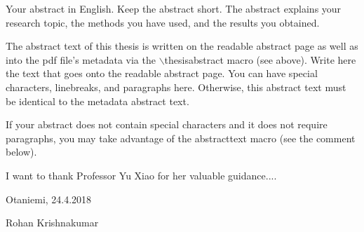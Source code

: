 \documentclass[english, 12pt, a4paper, elec, utf8, a-1b, online]{aaltothesis}
\date{24.4.2018}
\begin{document}
\makecoverpage

\makecopyrightpage


\begin{abstractpage}[english]
  Your abstract in English. Keep the abstract short. The abstract explains your
  research topic, the methods you have used, and the results you obtained.  
  
  The abstract text of this thesis is written on the readable abstract page as
  well as into the pdf file's metadata via the $\backslash$thesisabstract macro
  (see above). Write here the text that goes onto the readable abstract page.
  You can have special characters, linebreaks, and paragraphs here. Otherwise,
  this abstract text must be identical to the metadata abstract text.
  
  If your abstract does not contain special characters and it does not require
  paragraphs, you may take advantage of the abstracttext macro (see the comment
  below).
\end{abstractpage}


I want to thank Professor Yu Xiao for her valuable guidance....

\vspace{5cm}
Otaniemi, 24.4.2018

\vspace{5mm}
{\hfill Rohan Krishnakumar \hspace{1cm}}

\newpage
\end{document}
